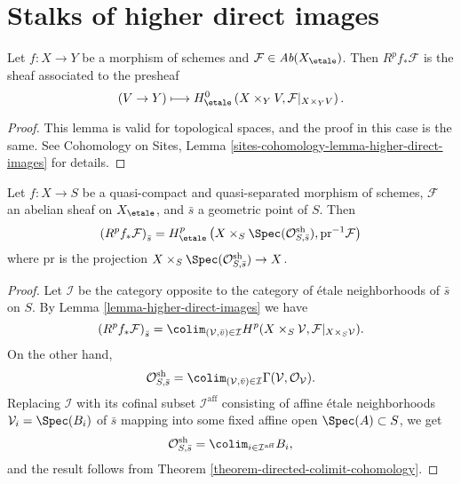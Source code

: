 \section{Stalks of higher direct images}
\label{section-stalks-direct-image}

\begin{lemma}
\label{lemma-higher-direct-images}
Let $f: X\to Y$ be a morphism of schemes and $\mathcal{F}\in
\textit{Ab}(X_\etale)$. Then $R^pf_*\mathcal{F}$ is the sheaf
associated to the presheaf
$$
(V\to Y)\longmapsto H_\etale^0 \left(X \times_Y V,
\mathcal{F}|_{X \times_Y V}\right).
$$
\end{lemma}

\begin{proof}
This lemma is valid for topological spaces, and the proof in this case is the
same. See
Cohomology on Sites, Lemma
\ref{sites-cohomology-lemma-higher-direct-images}
for details.
\end{proof}

\begin{theorem}
\label{theorem-higher-direct-images}
Let $f: X\to S$ be a quasi-compact and quasi-separated morphism of schemes,
$\mathcal{F}$ an abelian sheaf on $X_\etale$, and $\bar s$ a
geometric point of $S$. Then
$$
\left(R^pf_* \mathcal{F}\right)_{\bar s} = H_\etale^p\left( X \times_S
\Spec(\mathcal{O}_{S, \bar s}^\mathrm{sh}),
\text{pr}^{-1}\mathcal{F}\right)
$$
where $\text{pr}$ is the projection $X \times_S \Spec(\mathcal{O}_{S,
\bar{s}}^\mathrm{sh}) \to X$.
\end{theorem}

\begin{proof}
Let $\mathcal{I}$ be the category opposite to the category of \'etale
neighborhoods of $\bar s$ on $S$. By Lemma \ref{lemma-higher-direct-images}
we have
$$
\left(R^pf_*\mathcal{F}\right)_{\bar{s}} = \colim_{(\mathcal{V},
\bar{v})\in \mathcal{I}} H^p(X \times_S\mathcal{V},
\mathcal{F}|_{X \times_S\mathcal{V}}).
$$
On the other hand,
$$
\mathcal{O}_{S, \bar{s}}^\mathrm{sh} = \colim_{(\mathcal{V}, \bar v)\in
\mathcal{I}} \Gamma(\mathcal{V}, \mathcal{O}_\mathcal{V}).
$$
Replacing $\mathcal{I}$ with its cofinal subset $\mathcal{I}^\mathrm{aff}$
consisting of affine \'etale neighborhoods $\mathcal{V}_i= \Spec(B_i)$ of
$\bar s$ mapping into some fixed affine open $\Spec(A) \subset S$, we get
$$
\mathcal{O}_{S, \bar{s}}^\mathrm{sh} = \colim_{i\in
\mathcal{I}^\mathrm{aff}} B_i,
$$
and the result follows from Theorem \ref{theorem-directed-colimit-cohomology}.
\end{proof}





